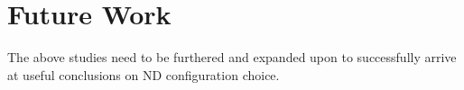 \documentclass[12pt]{article}
\begin{document}





\section{Future Work}\label{sec:Future}

The above studies need to be furthered and expanded upon to successfully arrive at useful conclusions on ND configuration choice. 
\end{document}
